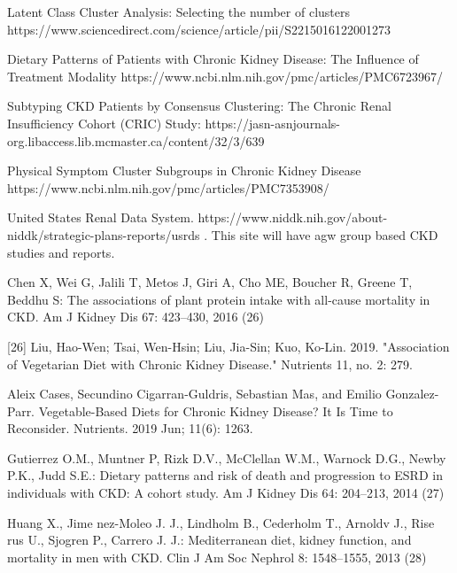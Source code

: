
\begin{thebibliography}{1}

  Latent Class Cluster Analysis: Selecting the number of clusters
https://www.sciencedirect.com/science/article/pii/S2215016122001273

Dietary Patterns of Patients with Chronic Kidney Disease: The Influence of Treatment Modality
https://www.ncbi.nlm.nih.gov/pmc/articles/PMC6723967/

 Subtyping CKD Patients by Consensus Clustering: The Chronic Renal Insufficiency Cohort (CRIC) Study: https://jasn-asnjournals-org.libaccess.lib.mcmaster.ca/content/32/3/639

 Physical Symptom Cluster Subgroups in Chronic Kidney Disease
https://www.ncbi.nlm.nih.gov/pmc/articles/PMC7353908/

 United States Renal Data System. https://www.niddk.nih.gov/about-niddk/strategic-plans-reports/usrds . This site will have agw group based CKD studies and reports.


  	Chen X, Wei G, Jalili T, Metos J, Giri A, Cho ME, Boucher R, Greene T, Beddhu S: The associations of plant protein intake with all-cause mortality in CKD. Am J Kidney Dis 67: 423–430, 2016 (26)

 [26]	Liu, Hao-Wen; Tsai, Wen-Hsin; Liu, Jia-Sin; Kuo, Ko-Lin. 2019. "Association of Vegetarian Diet with Chronic Kidney Disease." Nutrients 11, no. 2: 279.

 Aleix Cases, Secundino Cigarran-Guldris, Sebastian Mas, and Emilio Gonzalez-Parr. Vegetable-Based Diets for Chronic Kidney Disease? It Is Time to Reconsider. Nutrients. 2019 Jun; 11(6): 1263.

 Gutierrez O.M., Muntner P, Rizk D.V., McClellan W.M., Warnock D.G., Newby P.K., Judd S.E.: Dietary patterns and risk of death and progression to ESRD in individuals with CKD: A cohort study. Am J Kidney Dis 64: 204–213, 2014  (27)

 Huang X., Jime nez-Moleo J. J., Lindholm B., Cederholm T., Arnoldv J., Rise rus U., Sjogren P., Carrero J. J.: Mediterranean diet, kidney function, and mortality in men with CKD. Clin J Am Soc Nephrol 8: 1548–1555, 2013 (28)


\end{thebibliography}
